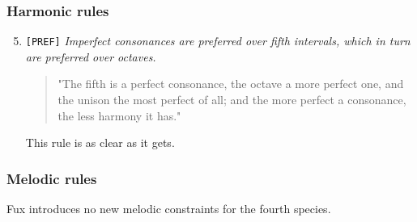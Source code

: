 \subsubsection{Harmonic rules}
\begin{enumerate}[wide, label=\bfseries 4.H\arabic*]
    \setcounter{enumi}{4}
    \item \texttt{[PREF]} \textit{Imperfect consonances are preferred over fifth intervals, which in turn are preferred over octaves.} \label{rule:prefer-fifths-over-octaves}    
    \begin{quotation}
        "The fifth is a perfect consonance, the octave a more perfect one, and the unison the most perfect of all; and the more perfect a consonance, the less harmony it has."
        \textcite[p.97]{GaPEng}
    \end{quotation}
    This rule is as clear as it gets.
\end{enumerate}

\subsubsection{Melodic rules}
Fux introduces no new melodic constraints for the fourth species.

